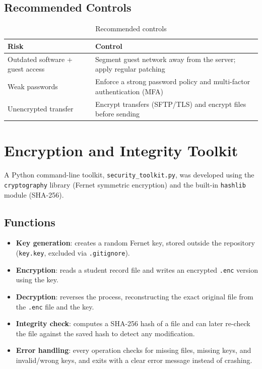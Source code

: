\documentclass[11pt,a4paper]{article}
\begin{document}
\subsection{Recommended Controls}

\begin{table}[h]
\centering
\begin{tabular}{p{5cm}p{8cm}}
\toprule
\textbf{Risk} & \textbf{Control} \\
\midrule
Outdated software + guest access & Segment guest network away from the server; apply regular patching \\
Weak passwords & Enforce a strong password policy and multi-factor authentication (MFA) \\
Unencrypted transfer & Encrypt transfers (SFTP/TLS) and encrypt files before sending \\
\bottomrule
\end{tabular}
\caption{Recommended controls}
\end{table}

\section{Encryption and Integrity Toolkit}

A Python command-line toolkit, \texttt{security\_toolkit.py}, was developed
using the \texttt{cryptography} library (Fernet symmetric encryption) and
the built-in \texttt{hashlib} module (SHA-256).

\subsection{Functions}

\begin{itemize}
    \item \textbf{Key generation}: creates a random Fernet key, stored outside the repository (\texttt{key.key}, excluded via \texttt{.gitignore}).
    \item \textbf{Encryption}: reads a student record file and writes an encrypted \texttt{.enc} version using the key.
    \item \textbf{Decryption}: reverses the process, reconstructing the exact original file from the \texttt{.enc} file and the key.
    \item \textbf{Integrity check}: computes a SHA-256 hash of a file and can later re-check the file against the saved hash to detect any modification.
    \item \textbf{Error handling}: every operation checks for missing files, missing keys, and invalid/wrong keys, and exits with a clear error message instead of crashing.
\end{itemize}
\end{document}
